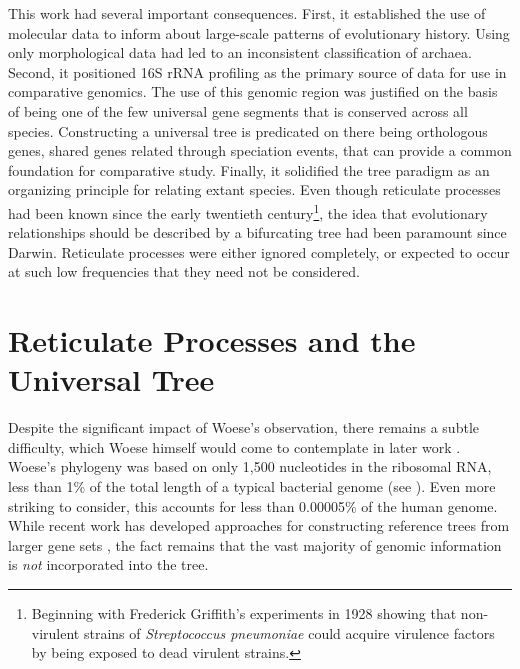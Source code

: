 This work had several important consequences.
First, it established the use of molecular data to inform about large-scale patterns of evolutionary history.
Using only morphological data had led to an inconsistent classification of archaea.
Second, it positioned 16S rRNA profiling as the primary source of data for use in comparative genomics.
The use of this genomic region was justified on the basis of being one of the few universal gene segments that is conserved across all species.
Constructing a universal tree is predicated on there being orthologous genes, shared genes related through speciation events, that can provide a common foundation for comparative study.
Finally, it solidified the tree paradigm as an organizing principle for relating extant species.
Even though reticulate processes had been known since the early twentieth century\footnote{Beginning with Frederick Griffith's experiments in 1928 showing that non-virulent strains of \emph{Streptococcus pneumoniae} could acquire virulence factors by being exposed to dead virulent strains.}, the idea that evolutionary relationships should be described by a bifurcating tree had been paramount since Darwin. 
Reticulate processes were either ignored completely, or expected to occur at such low frequencies that they need not be considered.

\section{Reticulate Processes and the Universal Tree}

Despite the significant impact of Woese's observation, there remains a subtle difficulty, which Woese himself would come to contemplate in later work \cite{Woese:2004ba,Goldenfeld:2007im}.
Woese's phylogeny was based on only 1,500 nucleotides in the ribosomal RNA, less than 1\% of the total length of a typical bacterial genome (see \cite{Dagan:2006up}).
Even more striking to consider, this accounts for less than 0.00005\% of the human genome.
While recent work has developed approaches for constructing reference trees from larger gene sets \cite{Ciccarelli:2006gw}, the fact remains that the vast majority of genomic information is \emph{not} incorporated into the tree.

